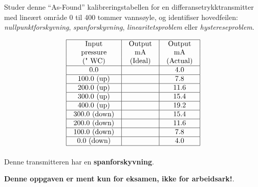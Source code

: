 

Studer denne ``As-Found'' kalibreringstabellen for en differansetrykktransmitter med lineært område 0 til 400 tommer vannsøyle, og identifiser hovedfeilen: {\it nullpunktforskyvning}, {\it spanforskyvning}, {\it linearitetsproblem} eller {\it hystereseproblem}.


$$\vbox{\offinterlineskip
\halign{\strut
\vrule \quad\hfil # \ \hfil & 
\vrule \quad\hfil # \ \hfil & 
\vrule \quad\hfil # \ \hfil \vrule \cr
\noalign{\hrule}
%
Input & Output & Output \cr
%
pressure & mA & mA \cr
%
(" WC) & (Ideal) & (Actual) \cr
%
\noalign{\hrule}
%
0.0 & & 4.0 \cr
%
\noalign{\hrule}
%
100.0 (up) & & 7.8 \cr
%
\noalign{\hrule}
%
200.0 (up) & & 11.6 \cr
%
\noalign{\hrule}
%
300.0 (up) & & 15.4 \cr
%
\noalign{\hrule}
%
400.0 (up) & & 19.2 \cr
%
\noalign{\hrule}
%
300.0 (down) & & 15.4 \cr
%
\noalign{\hrule}
%
200.0 (down) & & 11.6 \cr
%
\noalign{\hrule}
%
100.0 (down) & & 7.8 \cr
%
\noalign{\hrule}
%
0.0 (down) & & 4.0 \cr
%
\noalign{\hrule}
} %
}$$ %







Denne transmitteren har en {\bf spanforskyvning}.







{\bf Denne oppgaven er ment kun for eksamen, ikke for arbeidsark!}.


